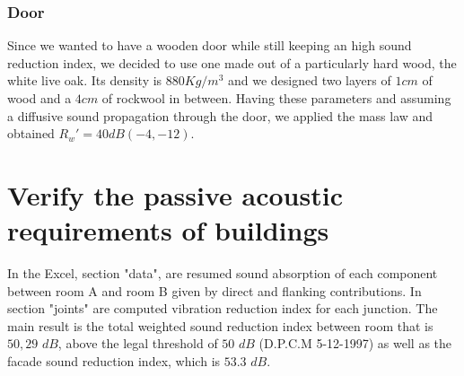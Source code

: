 \documentclass[]{scrartcl}
\begin{document}
\subsubsection{Door}
Since we wanted to have a wooden door while still keeping an high sound reduction index, we decided to use one made out of a particularly hard wood, the white live oak\cite{wood}. Its density is $\mathit{880 Kg/m^3}$ and we designed two layers of $\mathit{1 cm}$ of wood and a $\mathit{4 cm}$ of rockwool in between. Having these parameters and assuming a diffusive sound propagation through the door, we applied the mass law and obtained $R_w'= 40 dB (-4, -12)$. 

\section{Verify the passive acoustic requirements of buildings}  

In the Excel, section "data", are resumed sound absorption of each component between room A and room B given by direct and flanking contributions. In section "joints" are computed  vibration reduction index for each junction. The main result is the total weighted sound reduction index between room that is  $50,29$ $dB$, above the legal threshold of $50$ $dB$ (D.P.C.M 5-12-1997) as well as the facade sound reduction index, which is $53.3$ $dB$. 

\printbibliography
\end{document}
